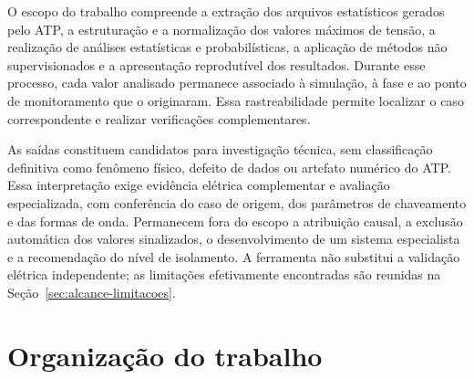 \documentclass[
	12pt,				%
	openright,			%
	oneside,			%
	a4paper,			%
	chapter=TITLE,		%
	section=TITLE,		%
	subsection=TITLE,	%
	subsubsection=TITLE,%
	english,			%
	brazilian			%
	]{abntex2}
\theoremstyle{definition}
\begin{document}


O escopo do trabalho compreende a extração dos arquivos estatísticos gerados pelo ATP, a estruturação e a normalização dos valores máximos de tensão, a realização de análises estatísticas e probabilísticas, a aplicação de métodos não supervisionados e a apresentação reprodutível dos resultados. Durante esse processo, cada valor analisado permanece associado à simulação, à fase e ao ponto de monitoramento que o originaram. Essa rastreabilidade permite localizar o caso correspondente e realizar verificações complementares.

As saídas constituem candidatos para investigação técnica, sem classificação definitiva como fenômeno físico, defeito de dados ou artefato numérico do ATP. Essa interpretação exige evidência elétrica complementar e avaliação especializada, com conferência do caso de origem, dos parâmetros de chaveamento e das formas de onda. Permanecem fora do escopo a atribuição causal, a exclusão automática dos valores sinalizados, o desenvolvimento de um sistema especialista e a recomendação do nível de isolamento. A ferramenta não substitui a validação elétrica independente; as limitações efetivamente encontradas são reunidas na Seção~\ref{sec:alcance-limitacoes}.


\section{Organização do trabalho}

\end{document}
